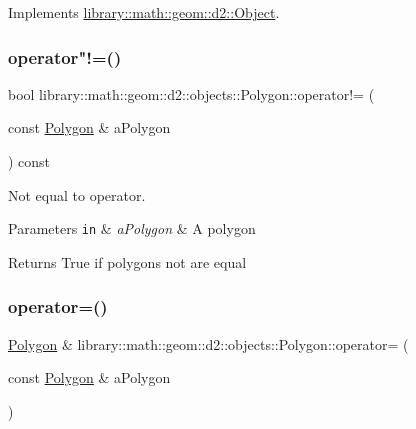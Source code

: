 Implements \hyperlink{classlibrary_1_1math_1_1geom_1_1d2_1_1_object_ae9506254971168a3ca63e1923556b70d}{library\+::math\+::geom\+::d2\+::\+Object}.

\mbox{\label{classlibrary_1_1math_1_1geom_1_1d2_1_1objects_1_1_polygon_a904fe22c8a690a6b5eb4f8746602d637}} 
\subsubsection{\texorpdfstring{operator"!=()}{operator!=()}}
{\footnotesize\ttfamily bool library\+::math\+::geom\+::d2\+::objects\+::\+Polygon\+::operator!= (\begin{DoxyParamCaption}\item[{const \hyperlink{classlibrary_1_1math_1_1geom_1_1d2_1_1objects_1_1_polygon}{Polygon} \&}]{a\+Polygon }\end{DoxyParamCaption}) const}



Not equal to operator. 


\begin{DoxyCode}
\end{DoxyCode}



\begin{DoxyParams}[1]{Parameters}
\mbox{\tt in}  & {\em a\+Polygon} & A polygon \\
\hline
\end{DoxyParams}
\begin{DoxyReturn}{Returns}
True if polygons not are equal 
\end{DoxyReturn}
\mbox{\label{classlibrary_1_1math_1_1geom_1_1d2_1_1objects_1_1_polygon_afd72b5c2aa958835958d197ee57c3152}} 
\subsubsection{\texorpdfstring{operator=()}{operator=()}}
{\footnotesize\ttfamily \hyperlink{classlibrary_1_1math_1_1geom_1_1d2_1_1objects_1_1_polygon}{Polygon} \& library\+::math\+::geom\+::d2\+::objects\+::\+Polygon\+::operator= (\begin{DoxyParamCaption}\item[{const \hyperlink{classlibrary_1_1math_1_1geom_1_1d2_1_1objects_1_1_polygon}{Polygon} \&}]{a\+Polygon }\end{DoxyParamCaption})}



